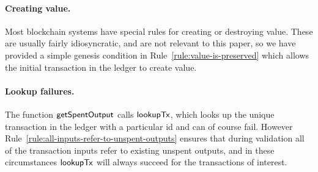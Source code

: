 \vspace{-8mm}
\paragraph{Creating value.}
Most blockchain systems have special rules for creating or destroying value.
These are usually fairly idiosyncratic, and are not relevant to this paper, so
we have provided a simple genesis condition in
Rule~\ref{rule:value-is-preserved} which allows the initial transaction in the ledger
to create value.
\vspace{-1mm}
\paragraph{Lookup failures.}
The function $\mathsf{getSpentOutput}$ calls $\mathsf{lookupTx}$, which looks up the unique
transaction in the ledger with a particular id and can of course
fail. However Rule~\ref{rule:all-inputs-refer-to-unspent-outputs}
ensures that during validation all of the transaction inputs refer to
existing unspent outputs, and in these circumstances $\mathsf{lookupTx}$ will
always succeed for the transactions of interest.

